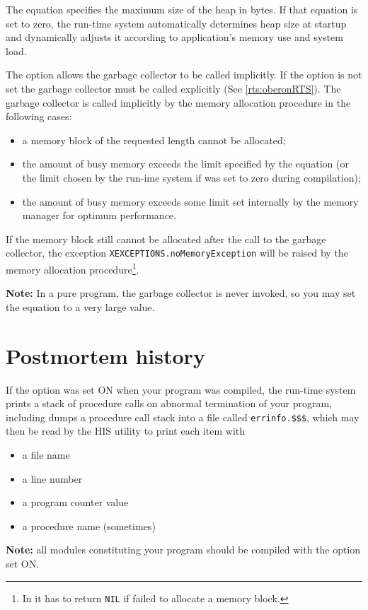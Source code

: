 The equation  specifies the maximum size of the heap
in bytes. If that equation is set to zero, the run-time system automatically
determines heap size at startup and dynamically adjusts it according to
application's memory use and system load.

The option  allows the garbage collector to be called
implicitly.
If the option is not set the garbage collector
must be called explicitly (See \ref{rts:oberonRTS}).
The garbage collector is called implicitly by the memory
allocation procedure in the following cases:
\begin{itemize}
\item
        a memory block of the requested length cannot be allocated;
\item
        the amount of busy memory exceeds the limit
        specified by the  equation (or the limit
        chosen by the run-ime system if  was set to zero
        during compilation);
\item
        the amount of busy memory exceeds some limit set
        internally by the memory manager for optimum performance.
\end{itemize}
If the memory block still cannot be allocated
after the call to the garbage collector, the exception
\verb'XEXCEPTIONS.noMemoryException' will be raised
by the \ot{} memory allocation procedure\footnote{In \mt{}
it has to return {\tt NIL} if failed to allocate a memory block.}.

{\bf Note:} In a pure \mt{} program, the garbage collector
is never invoked, so you may set the  equation
to a very large value.

\section{Postmortem history}\label{rts:history}

If the option  was
set ON when your program was compiled, the run-time system
\ifgenc prints a stack
of procedure calls on abnormal termination of your program, including
\else
dumps a procedure call stack into a file called \verb'errinfo.$$$', which
may then be read by the HIS utility to print each item with
\fi
\begin{itemize}
\item a file name
\item a line number
\item a program counter value
\item a procedure name (sometimes)
\end{itemize}
{\bf Note:} all modules constituting your program should be compiled with
the option  set ON.


